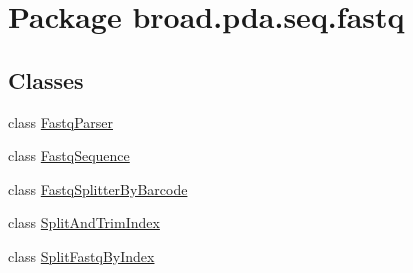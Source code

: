 \hypertarget{namespacebroad_1_1pda_1_1seq_1_1fastq}{\section{Package broad.\+pda.\+seq.\+fastq}
\label{namespacebroad_1_1pda_1_1seq_1_1fastq}
}
\subsection*{Classes}
\begin{DoxyCompactItemize}
\item 
class \hyperlink{classbroad_1_1pda_1_1seq_1_1fastq_1_1_fastq_parser}{Fastq\+Parser}
\item 
class \hyperlink{classbroad_1_1pda_1_1seq_1_1fastq_1_1_fastq_sequence}{Fastq\+Sequence}
\item 
class \hyperlink{classbroad_1_1pda_1_1seq_1_1fastq_1_1_fastq_splitter_by_barcode}{Fastq\+Splitter\+By\+Barcode}
\item 
class \hyperlink{classbroad_1_1pda_1_1seq_1_1fastq_1_1_split_and_trim_index}{Split\+And\+Trim\+Index}
\item 
class \hyperlink{classbroad_1_1pda_1_1seq_1_1fastq_1_1_split_fastq_by_index}{Split\+Fastq\+By\+Index}
\end{DoxyCompactItemize}
